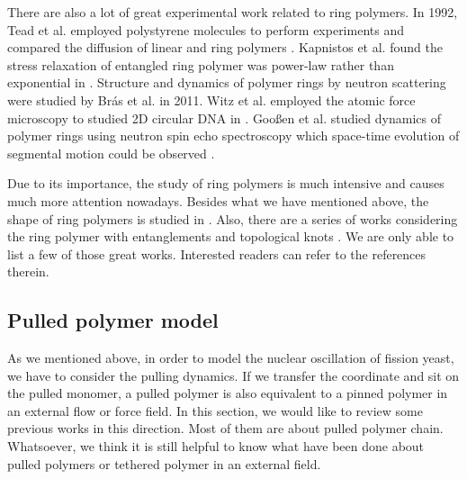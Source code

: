 There are also a lot of great experimental work related to ring polymers. In 1992, Tead et al. employed polystyrene molecules to perform experiments and compared the diffusion of linear and ring polymers \cite{Tead1992}. Kapnistos et al. found the stress relaxation of entangled ring polymer was power-law rather than exponential in \cite{Kapnistos2008}. Structure and dynamics of polymer rings by neutron scattering were studied by Br\'{a}s et al. in 2011. Witz et al. employed the atomic force microscopy to studied 2D circular DNA in \cite{Witz2008,Witz2011}.  Goo{\ss}en et al. studied dynamics of polymer rings using neutron spin echo spectroscopy which space-time evolution of segmental motion could be observed \cite{goossen2014,Goossen2015}. 

Due to its importance, the study of ring polymers is much intensive and causes much more attention nowadays. Besides what we have mentioned above, the shape of ring polymers is studied in \cite{Bishop1985,Jagodzinski1992,Alim2007,Reiss2011}. Also, there are a series of works considering the ring polymer with entanglements and topological knots \cite{Michels1982,Polymers1991,Koniaris1991,Grosberg1996,Shimamura2001,Orlandini2003,Tubiana2011,Uehara2014,Li2015a}.
We are only able to list a few of those great works. Interested readers can refer to the references therein. 

\subsection{Pulled polymer model}
\label{sub:pulled_polymer_model}

As we mentioned above, in order to model the nuclear oscillation of fission yeast, we have to consider the pulling dynamics. If we transfer the coordinate and sit on the pulled monomer, a pulled polymer is also equivalent to a pinned polymer in an external flow or force field. In this section, we would like to review some previous works in this direction. Most of them are about pulled polymer chain. Whatsoever, we think it is still helpful to know what have been done about pulled polymers or tethered polymer in an external field.

